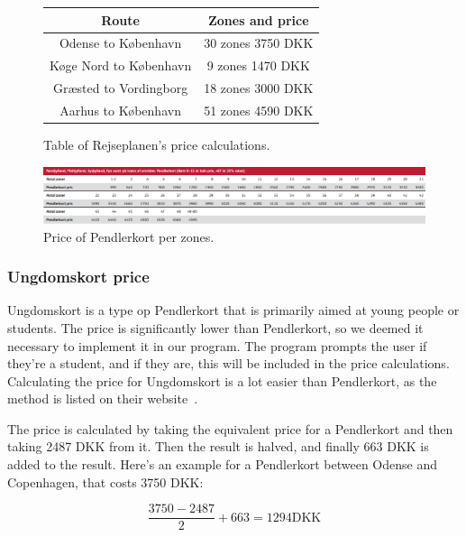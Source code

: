 \begin{figure}[H]
    \centering
    \noindent
    \begin{tabular}{ || c | c || }
        \hline
        Route & Zones and price \\
        \hline\hline
        Odense to København & 30 zones 3750 DKK \\
        \hline
        Køge Nord to København & 9 zones 1470 DKK \\
        \hline
        Græsted to Vordingborg & 18 zones 3000 DKK \\
        \hline
        Aarhus to København & 51 zones 4590 DKK \\
        \hline
    \end{tabular}
    \caption{Table of Rejseplanen's price calculations.}
    \label{fig:table-rejseplanen-price-calculations}
\end{figure}

\begin{figure}[H]
    \centering
    \includegraphics[width=1\textwidth]{images/dsb-pendlerkort-pris.jpg}
    \caption{Price of Pendlerkort per zones.~\cite{price_sheet}}
    \label{fig:image-dsb-pendlerkort-pris}
\end{figure}

\subsubsection{Ungdomskort price}

Ungdomskort is a type op Pendlerkort that is primarily aimed at young people or students.
The price is significantly lower than Pendlerkort, so we deemed it necessary to implement it in our program.
The program prompts the user if they're a student, and if they are, this will be included in the price calculations.
Calculating the price for Ungdomskort is a lot easier than Pendlerkort, as the method is listed on their
website~\cite{price_ung}.

The price is calculated by taking the equivalent price for a Pendlerkort and then taking 2487 DKK from it.
Then the result is halved, and finally 663 DKK is added to the result.
Here's an example for a Pendlerkort between Odense and Copenhagen, that costs 3750 DKK:

\begin{equation}
    \frac{3750 - 2487}{2} + 663 = 1294 \text{DKK}
\end{equation}

